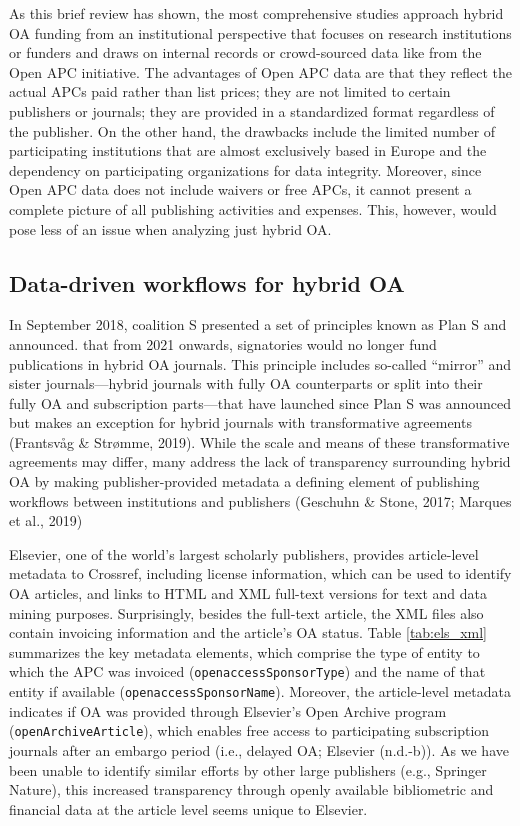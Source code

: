 \documentclass[a4paper,man,floatsintext,longtable,noextraspace,12pt]{apa6}
\begin{document}
As this brief review has shown, the most comprehensive studies approach
hybrid OA funding from an institutional perspective that focuses on
research institutions or funders and draws on internal records or
crowd-sourced data like from the Open APC initiative. The advantages of
Open APC data are that they reflect the actual APCs paid rather than
list prices; they are not limited to certain publishers or journals;
they are provided in a standardized format regardless of the publisher.
On the other hand, the drawbacks include the limited number of
participating institutions that are almost exclusively based in Europe
and the dependency on participating organizations for data integrity.
Moreover, since Open APC data does not include waivers or free APCs, it
cannot present a complete picture of all publishing activities and
expenses. This, however, would pose less of an issue when analyzing just
hybrid OA.

\hypertarget{data-driven-workflows-for-hybrid-oa}{%
\subsection{Data-driven workflows for hybrid
OA}\label{data-driven-workflows-for-hybrid-oa}}

In September 2018, coalition S presented a set of principles known as
Plan S and announced. that from 2021 onwards, signatories would no
longer fund publications in hybrid OA journals. This principle includes
so-called ``mirror'' and sister journals---hybrid journals with fully OA
counterparts or split into their fully OA and subscription parts---that
have launched since Plan S was announced but makes an exception for
hybrid journals with transformative agreements (Frantsvåg \& Strømme,
2019). While the scale and means of these transformative agreements may
differ, many address the lack of transparency surrounding hybrid OA by
making publisher-provided metadata a defining element of publishing
workflows between institutions and publishers (Geschuhn \& Stone, 2017;
Marques et al., 2019)

Elsevier, one of the world's largest scholarly publishers, provides
article-level metadata to Crossref, including license information, which
can be used to identify OA articles, and links to HTML and XML full-text
versions for text and data mining purposes. Surprisingly, besides the
full-text article, the XML files also contain invoicing information and
the article's OA status. Table \ref{tab:els_xml} summarizes the key
metadata elements, which comprise the type of entity to which the APC
was invoiced (\texttt{openaccessSponsorType}) and the name of that
entity if available (\texttt{openaccessSponsorName}). Moreover, the
article-level metadata indicates if OA was provided through Elsevier's
Open Archive program (\texttt{openArchiveArticle}), which enables free
access to participating subscription journals after an embargo period
(i.e., delayed OA; Elsevier (n.d.-b)). As we have been unable to
identify similar efforts by other large publishers (e.g., Springer
Nature), this increased transparency through openly available
bibliometric and financial data at the article level seems unique to
Elsevier.
\end{document}
